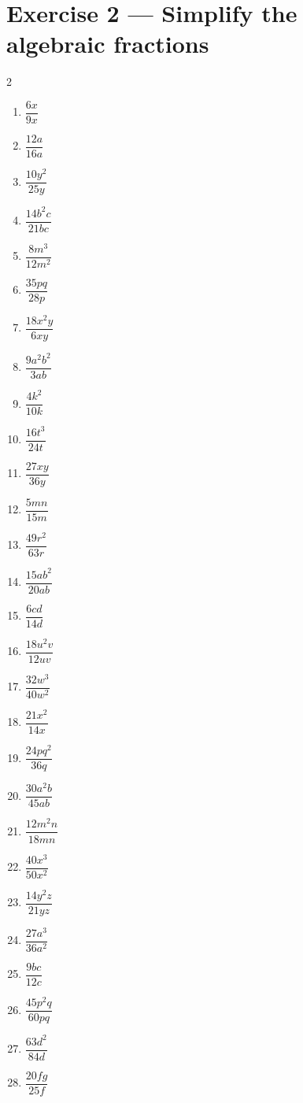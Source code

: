 \documentclass[12pt]{article}
\begin{document}
\newpage
\section*{Exercise 2 — Simplify the algebraic fractions}
\begin{multicols}{2}
\begin{enumerate}
\item $\dfrac{6x}{9x}$
\item $\dfrac{12a}{16a}$
\item $\dfrac{10y^{2}}{25y}$
\item $\dfrac{14b^{2}c}{21bc}$
\item $\dfrac{8m^{3}}{12m^{2}}$
\item $\dfrac{35pq}{28p}$
\item $\dfrac{18x^{2}y}{6xy}$
\item $\dfrac{9a^{2}b^{2}}{3ab}$
\item $\dfrac{4k^{2}}{10k}$
\item $\dfrac{16t^{3}}{24t}$
\item $\dfrac{27xy}{36y}$
\item $\dfrac{5mn}{15m}$
\item $\dfrac{49r^{2}}{63r}$
\item $\dfrac{15ab^{2}}{20ab}$
\item $\dfrac{6cd}{14d}$
\item $\dfrac{18u^{2}v}{12uv}$
\item $\dfrac{32w^{3}}{40w^{2}}$
\item $\dfrac{21x^{2}}{14x}$
\item $\dfrac{24pq^{2}}{36q}$
\item $\dfrac{30a^{2}b}{45ab}$
\item $\dfrac{12m^{2}n}{18mn}$
\item $\dfrac{40x^{3}}{50x^{2}}$
\item $\dfrac{14y^{2}z}{21yz}$
\item $\dfrac{27a^{3}}{36a^{2}}$
\item $\dfrac{9bc}{12c}$
\item $\dfrac{45p^{2}q}{60pq}$
\item $\dfrac{63d^{2}}{84d}$
\item $\dfrac{20fg}{25f}$
\end{enumerate}
\end{multicols}

\newpage
\end{document}
